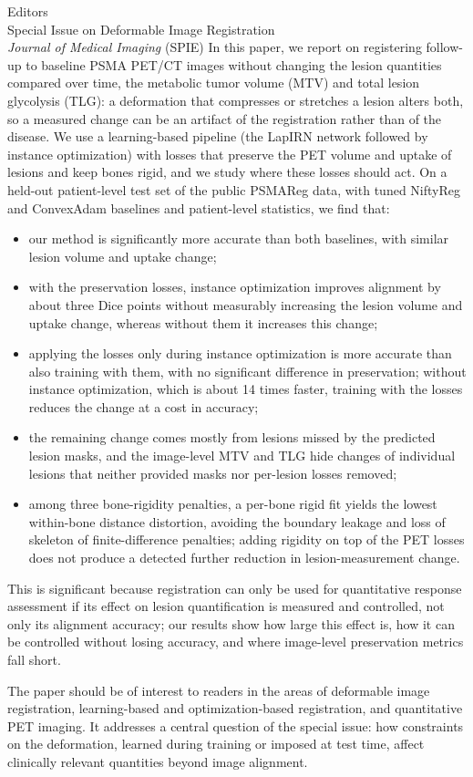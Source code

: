 \documentclass[11pt,a4paper]{letter}
\begin{document}
\begin{letter}{Editors\\
Special Issue on Deformable Image Registration\\
\textit{Journal of Medical Imaging} (SPIE)}
In this paper, we report on registering follow-up to baseline PSMA PET/CT images without changing the lesion quantities compared over time, the metabolic tumor volume (MTV) and total lesion glycolysis (TLG): a deformation that compresses or stretches a lesion alters both, so a measured change can be an artifact of the registration rather than of the disease.
We use a learning-based pipeline (the LapIRN network followed by instance optimization) with losses that preserve the PET volume and uptake of lesions and keep bones rigid, and we study where these losses should act.
On a held-out patient-level test set of the public PSMAReg data, with tuned NiftyReg and ConvexAdam baselines and patient-level statistics, we find that:
\begin{itemize}
  \item our method is significantly more accurate than both baselines, with similar lesion volume and uptake change;
  \item with the preservation losses, instance optimization improves alignment by about three Dice points without measurably increasing the lesion volume and uptake change, whereas without them it increases this change;
  \item applying the losses only during instance optimization is more accurate than also training with them, with no significant difference in preservation; without instance optimization, which is about 14 times faster, training with the losses reduces the change at a cost in accuracy;
  \item the remaining change comes mostly from lesions missed by the predicted lesion masks, and the image-level MTV and TLG hide changes of individual lesions that neither provided masks nor per-lesion losses removed;
  \item among three bone-rigidity penalties, a per-bone rigid fit yields the lowest within-bone distance distortion, avoiding the boundary leakage and loss of skeleton of finite-difference penalties; adding rigidity on top of the PET losses does not produce a detected further reduction in lesion-measurement change.
\end{itemize}
This is significant because registration can only be used for quantitative response assessment if its effect on lesion quantification is measured and controlled, not only its alignment accuracy; our results show how large this effect is, how it can be controlled without losing accuracy, and where image-level preservation metrics fall short.

The paper should be of interest to readers in the areas of deformable image registration, learning-based and optimization-based registration, and quantitative PET imaging.
It addresses a central question of the special issue: how constraints on the deformation, learned during training or imposed at test time, affect clinically relevant quantities beyond image alignment.


\end{letter}
\end{document}
